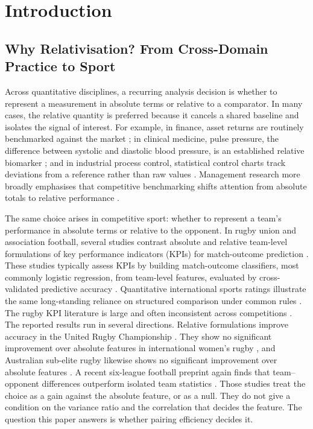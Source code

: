 \section{Introduction}

\subsection{Why Relativisation? From Cross-Domain Practice to Sport}

Across quantitative disciplines, a recurring analysis decision is whether to represent a measurement in absolute terms or relative to a comparator. In many cases, the relative quantity is preferred because it cancels a shared baseline and isolates the signal of interest. For example, in finance, asset returns are routinely benchmarked against the market \parencite{sharpe1966,fama1970}; in clinical medicine, pulse pressure, the difference between systolic and diastolic blood pressure, is an established relative biomarker \parencite{franklin1999,blacher1999}; and in industrial process control, statistical control charts track deviations from a reference rather than raw values \parencite{montgomery2012}. Management research more broadly emphasises that competitive benchmarking shifts attention from absolute totals to relative performance \parencite{keiningham2015}.

The same choice arises in competitive sport: whether to represent a team's performance in absolute terms or relative to the opponent. In rugby union and association football, several studies contrast absolute and relative team-level formulations of key performance indicators (KPIs) for match-outcome prediction \parencite{bennett2019descriptive,bennett2021predicting,mosey2020,scott2023urc,scott2023womens}. These studies typically assess KPIs by building match-outcome classifiers, most commonly logistic regression, from team-level features, evaluated by cross-validated predictive accuracy \parencite{dixon1997,berrar2019}. Quantitative international sports ratings illustrate the same long-standing reliance on structured comparison under common rules \parencite{stefani2011}. The rugby KPI literature is large and often inconsistent across competitions \parencite{colomer2020,watson2017validity}. The reported results run in several directions. Relative formulations improve accuracy in the United Rugby Championship \parencite{scott2023urc}. They show no significant improvement over absolute features in international women's rugby \parencite{scott2023womens}, and Australian sub-elite rugby likewise shows no significant improvement over absolute features \parencite{mosey2020}. A recent six-league football preprint again finds that team--opponent differences outperform isolated team statistics \parencite{brito2026}. Those studies treat the choice as a gain against the absolute feature, or as a null. They do not give a condition on the variance ratio and the correlation that decides the feature. The question this paper answers is whether pairing efficiency decides it.

